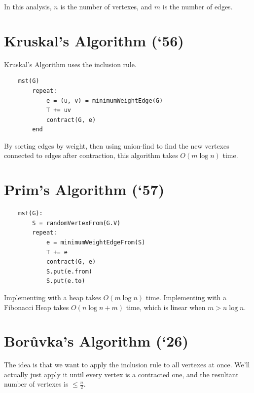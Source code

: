             In this analysis, $n$ is the number of vertexes, and $m$ is the number of edges.

            \section{Kruskal's Algorithm (`56)} %
            \label{sec:kruskal_s_algorithm_}
                Kruskal's Algorithm uses the inclusion rule.
                \begin{verbatim}
    mst(G)
        repeat:
            e = (u, v) = minimumWeightEdge(G)
            T += uv
            contract(G, e)
        end
                \end{verbatim}
                By sorting edges by weight, then using union-find to find the new vertexes connected to edges after contraction, this algorithm takes $O(m \log n)$ time.
            \section{Prim's Algorithm (`57)} %
            \label{sec:prim_s_algorithm_57}
                \begin{verbatim}
    mst(G):
        S = randomVertexFrom(G.V)
        repeat:
            e = minimumWeightEdgeFrom(S)
            T += e
            contract(G, e)
            S.put(e.from)
            S.put(e.to)
                \end{verbatim}
                Implementing with a heap takes $O(m \log n)$ time.
                Implementing with a Fibonacci Heap takes $O(n \log n + m)$ time, which is linear when $m > n \log n$.

            \section{Bor\r{u}vka's Algorithm (`26)} %
            \label{sec:borukva_s_algorithm_26}
                The idea is that we want to apply the inclusion rule to all vertexes at once.
                We'll actually just apply it until every vertex is a contracted one, and the resultant number of vertexes is $\le \frac{n}{2}$.
